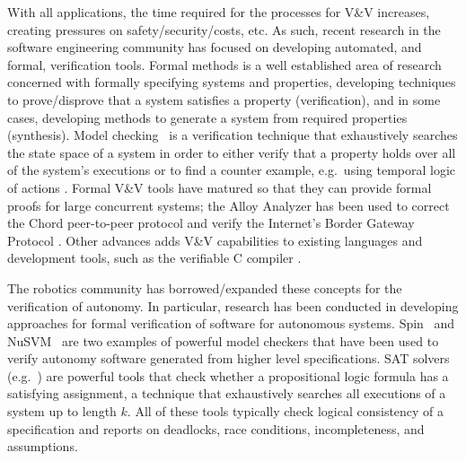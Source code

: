 With all applications, the time required for the processes for V\&V increases, creating pressures on safety/security/costs, etc. As such, recent research in the software engineering community has focused on developing automated, and formal, verification tools. Formal methods is a well established area of research concerned with formally specifying systems and properties, developing techniques to prove/disprove that a system satisfies a property (verification), and in some cases, developing methods to generate a system from required properties (synthesis). Model checking~\cite{clarke_99} is a verification technique that exhaustively searches the state space of a system in order to either verify that a property holds over all of the system's executions or to find a counter example, e.g.\  using temporal logic of actions \cite{tla}.  Formal V\&V tools have matured so that they can provide formal proofs for large concurrent systems; the Alloy Analyzer has been used to correct the Chord peer-to-peer protocol \cite{alloychord} and verify the Internet's Border Gateway Protocol \cite{alloybgp}. Other advances adds V\&V capabilities to existing languages and development tools, such as the verifiable C compiler \cite{vcc}.  




The robotics community has borrowed/expanded these concepts for the verification of autonomy. In particular, research has been conducted in developing approaches for formal verification of software for autonomous systems. Spin~\cite{spin} and NuSVM~\cite{nusvm} are two examples of powerful model checkers that have been used to verify autonomy software generated from higher level specifications. SAT solvers (e.g.~\cite{een03minisat,Herbstritt01zchaff:modifications}) are powerful tools that check whether a propositional logic formula has a satisfying assignment, a technique that exhaustively searches all executions of a system up to length $k$. All of these tools typically check logical consistency of a specification and reports on deadlocks, race conditions, incompleteness, and  assumptions. 



